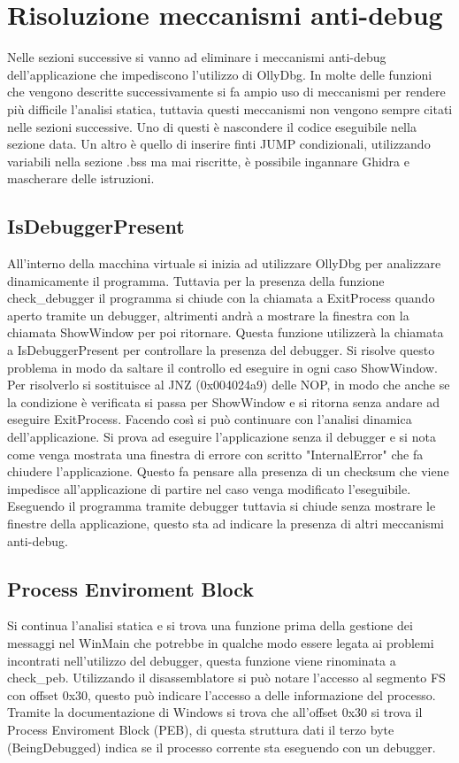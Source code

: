 \documentclass[a4paper,12pt]{article}
\begin{document}
\section{Risoluzione meccanismi anti-debug}
Nelle sezioni successive si vanno ad eliminare i meccanismi anti-debug dell'applicazione che impediscono l'utilizzo di OllyDbg. In molte delle funzioni che vengono descritte successivamente si fa ampio uso di meccanismi per rendere più difficile l'analisi statica, tuttavia questi meccanismi non vengono sempre citati nelle sezioni successive. Uno di questi è nascondere il codice eseguibile nella sezione data. Un altro è quello di inserire finti JUMP condizionali, utilizzando variabili nella sezione .bss ma mai riscritte, è possibile ingannare Ghidra e mascherare delle istruzioni.

\subsection{IsDebuggerPresent}
All'interno della macchina virtuale si inizia ad utilizzare OllyDbg per analizzare dinamicamente il programma. Tuttavia per la presenza della funzione check\_debugger il programma si chiude con la chiamata a ExitProcess quando aperto tramite un debugger, altrimenti andrà a mostrare la finestra con la chiamata ShowWindow per poi ritornare.  Questa funzione utilizzerà la chiamata a IsDebuggerPresent per controllare la presenza del debugger.
Si risolve questo problema in modo da saltare il controllo ed eseguire in ogni caso ShowWindow. Per risolverlo si sostituisce al JNZ (0x004024a9) delle NOP, in modo che anche se la condizione è verificata si passa per ShowWindow e si ritorna senza andare ad eseguire ExitProcess.
 Facendo così si può continuare con l'analisi dinamica dell'applicazione. Si prova ad eseguire l'applicazione senza il debugger e si nota come venga mostrata una finestra di errore con scritto "InternalError" che fa chiudere l'applicazione. Questo fa pensare alla presenza di un checksum che viene impedisce all'applicazione di partire nel caso venga modificato l'eseguibile.  Eseguendo il programma tramite debugger tuttavia si chiude senza mostrare le finestre della applicazione, questo sta ad indicare la presenza di altri meccanismi anti-debug. 

\subsection{Process Enviroment Block}
Si continua l'analisi statica e si trova una funzione prima della gestione dei messaggi nel WinMain che potrebbe in qualche modo essere legata ai problemi incontrati nell'utilizzo del debugger, questa funzione viene rinominata a check\_peb. Utilizzando il disassemblatore si può notare l'accesso al segmento FS con offset 0x30, questo può indicare l'accesso a delle informazione del processo. Tramite la documentazione di Windows si trova che all'offset 0x30 si trova il Process Enviroment Block (PEB), di questa struttura dati il terzo byte (BeingDebugged) indica se il processo corrente sta eseguendo con un debugger.
\end{document}
